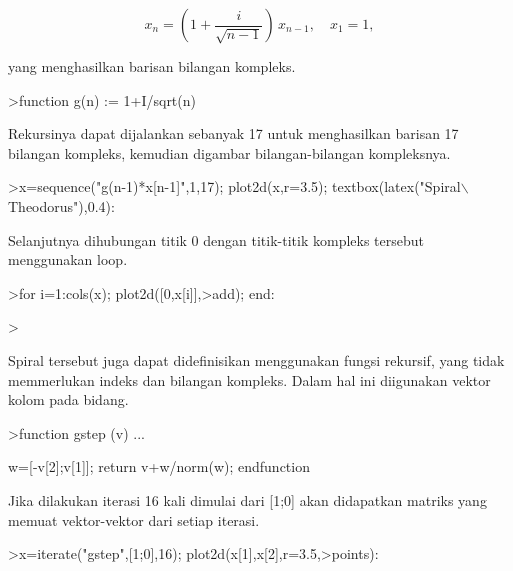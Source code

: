\documentclass[a4paper,10pt]{article}
\begin{document}
\begin{eulernotebook}
\begin{eulercomment}
\begin{eulercomment}
\begin{eulercomment}
\begin{eulercomment}
\begin{eulercomment}
\end{eulercomment}
\begin{eulerformula}
\[
x_n = \left( 1 + \frac{i}{\sqrt{n-1}} \right) \, x_{n-1}, \quad x_1=1,
\]
\end{eulerformula}
\begin{eulercomment}
yang menghasilkan barisan bilangan kompleks.
\end{eulercomment}
\begin{eulerprompt}
>function g(n) := 1+I/sqrt(n)
\end{eulerprompt}
\begin{eulercomment}
Rekursinya dapat dijalankan sebanyak 17 untuk menghasilkan barisan 17 bilangan kompleks,
kemudian digambar bilangan-bilangan kompleksnya.
\end{eulercomment}
\begin{eulerprompt}
>x=sequence("g(n-1)*x[n-1]",1,17); plot2d(x,r=3.5); textbox(latex("Spiral\(\backslash\) Theodorus"),0.4):
\end{eulerprompt}
\begin{eulercomment}
Selanjutnya dihubungan titik 0 dengan titik-titik kompleks tersebut menggunakan loop.
\end{eulercomment}
\begin{eulerprompt}
>for i=1:cols(x); plot2d([0,x[i]],>add); end:
\end{eulerprompt}
\begin{eulerprompt}
> 
\end{eulerprompt}
\begin{eulercomment}
Spiral tersebut juga dapat didefinisikan menggunakan fungsi rekursif, yang tidak memmerlukan
indeks dan bilangan kompleks. Dalam hal ini diigunakan vektor kolom pada bidang.
\end{eulercomment}
\begin{eulerprompt}
>function gstep (v) ...
\end{eulerprompt}
\begin{eulerudf}
  w=[-v[2];v[1]];
  return v+w/norm(w);
  endfunction
\end{eulerudf}
\begin{eulercomment}
Jika dilakukan iterasi 16 kali dimulai dari [1;0] akan didapatkan matriks yang memuat
vektor-vektor dari setiap iterasi.
\end{eulercomment}
\begin{eulerprompt}
>x=iterate("gstep",[1;0],16); plot2d(x[1],x[2],r=3.5,>points):
\end{eulerprompt}

\end{eulercomment}
\end{eulercomment}
\end{eulercomment}
\end{eulercomment}
\end{eulernotebook}
\end{document}
